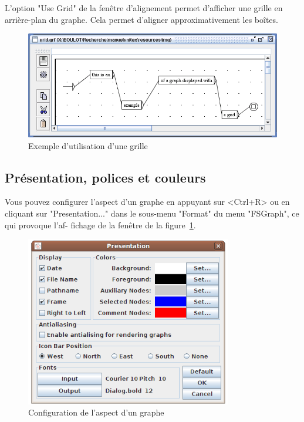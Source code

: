 \bigskip
\noindent L’option "Use Grid" de la fenêtre d’alignement permet d’afficher une grille en
arrière-plan du graphe. Cela permet d’aligner approximativement les boîtes.

\bigskip
\begin{figure}[!h]
\begin{center}
\includegraphics[width=15cm]{resources/img/fig5-25.png}
\caption{Exemple d’utilisation d’une grille}
\end{center}
\end{figure}

\subsection{Présentation, polices et couleurs}
\label{section-display-fonts-colors}
Vous pouvez configurer l’aspect d’un graphe en appuyant sur <Ctrl+R> ou en cliquant
sur "Presentation..." dans le sous-menu "Format" du menu "FSGraph", ce qui provoque l’af-
fichage de la fenêtre de la figure~\ref{fig-graph-display-configuration}.

\begin{figure}[!h]
\begin{center}
\includegraphics[width=9cm]{resources/img/fig5-26.png}
\caption{Configuration de l’aspect d’un graphe\label{fig-graph-display-configuration}}
\end{center}
\end{figure}

